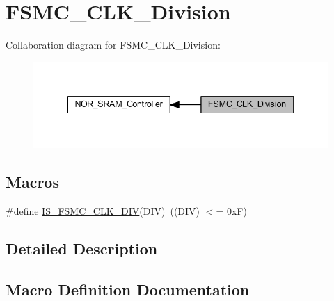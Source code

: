 \hypertarget{group___f_s_m_c___c_l_k___division}{}\section{F\+S\+M\+C\+\_\+\+C\+L\+K\+\_\+\+Division}
\label{group___f_s_m_c___c_l_k___division}
Collaboration diagram for F\+S\+M\+C\+\_\+\+C\+L\+K\+\_\+\+Division\+:
\nopagebreak
\begin{figure}[H]
\begin{center}
\leavevmode
\includegraphics[width=341pt]{group___f_s_m_c___c_l_k___division}
\end{center}
\end{figure}
\subsection*{Macros}
\begin{DoxyCompactItemize}
\item 
\#define \hyperlink{group___f_s_m_c___c_l_k___division_ga9e5321b02ea049fd076ba705acd06b5f}{I\+S\+\_\+\+F\+S\+M\+C\+\_\+\+C\+L\+K\+\_\+\+D\+IV}(D\+IV)~((D\+IV) $<$= 0x\+F)
\end{DoxyCompactItemize}


\subsection{Detailed Description}


\subsection{Macro Definition Documentation}
\mbox{\label{group___f_s_m_c___c_l_k___division_ga9e5321b02ea049fd076ba705acd06b5f}} 
